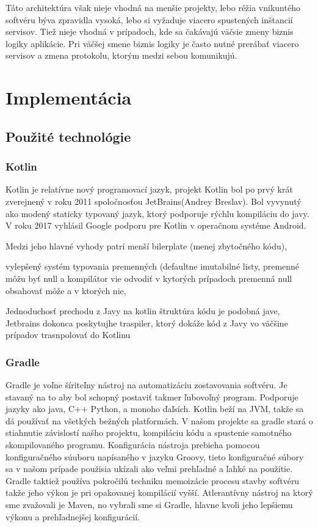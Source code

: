 Táto architektúra však nieje vhodná na menšie projekty, lebo réžia vnikuntého softvéru býva zpravidla vysoká, lebo si vyžaduje viacero spustených inštancií servisov. Tiež nieje vhodná v prípadoch, kde sa čakávajú väčsie zmeny biznis logiky aplikácie. Pri väčšej smene biznis logiky je často nutné prerábať viacero servisov a zmena protokolu, ktorým medzi sebou komunikujú.


\section{Implementácia}

\subsection{Použité technológie}

\subsubsection{Kotlin}
\noindent Kotlin je relatívne nový programovací jazyk, projekt Kotlin bol po prvý krát zverejnený v roku 2011 spoločnosťou JetBrains(Andrey Breslav). Bol vyvynutý ako modený staticky typovaný jazyk, ktorý podporuje rýchlu kompiláciu do javy. V roku 2017 vyhlásil Google podporu pre Kotlin v operačnom systéme Android. 

Medzi jeho hlavné vyhody patrí menší bilerplate (menej zbytočného kódu), 

vylepšený systém typovania premenných (defaultne imutabilné listy, premenné môžu byť null a kompilátor vie odvodiť v kytorých prípadoch premenná null obsahovať môže a v ktorých nie, 

Jednoduchosť prechodu z Javy na kotlin štruktúra kódu je podobná jave, Jetbrains dokonca poskytujhe traspiler, ktorý dokáže kód z Javy vo väčšine prípadov trasnpolovať do Kotlinu

\subsubsection{Gradle}
Gradle je voľne šíriteľny nástroj na automatizáciu zostavovania softvéru. Je stavaný na to aby bol schopný postaviť takmer ľubovoľný program. Podporuje jazyky ako java, C++ Python, a monoho ďaľsích. Kotlin beží na JVM, takže sa dá používať na všetkých bežných platformách. V našom projekte sa gradle stará o stiahnutie závislostí našho projektu, kompiláciu kódu a spustenie samotného skompilovaného programu. Konfigurácia nástroja prebieha pomocou konfiguračného súuboru napísaného v jazyku Groovy, tieto konfiguračné  súbory sa v našom prípade použisia ukízali ako veľmi prehľadné a ľahké na použitie. Gradle taktiež používa pokročilú techniku memoizácie procesu stavby softvéru takže jeho výkon je pri opakovanej kompilácií vyšší. Atlerantívny nástroj na ktorý sme zvažovali je Maven, no vybrali sme si Gradle, hlavne kvoli jeho lepšiemu výkonu a prehľadnejšej konfigurácií.

